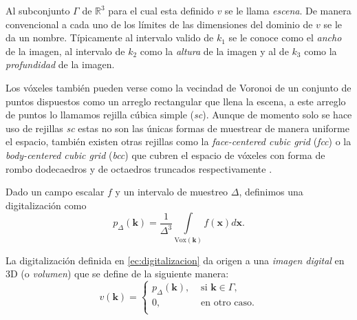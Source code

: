 Al subconjunto $\Gamma$ de $\mathbb{R}^3$ para el cual esta definido $v$ se le llama \emph{escena}. De manera convencional a cada uno de los límites de las dimensiones del dominio de $v$ se le da un nombre. Típicamente al intervalo valido de $k_1$ se le conoce como el \emph{ancho} de la imagen, al intervalo de $k_2$ como la \emph{altura} de la imagen y al de $k_3$ como la \emph{profundidad} de la imagen.

Los vóxeles también pueden verse como la vecindad de Voronoi de un conjunto de puntos dispuestos como un arreglo rectangular que llena la escena\cite{Gabor:DigitalSpaces}, a este arreglo de puntos lo llamamos rejilla cúbica simple (\emph{sc}). Aunque de momento solo se hace uso de rejillas \emph{sc} estas no son las únicas formas de muestrear de manera uniforme el espacio, también existen otras rejillas como la \emph{face-centered cubic grid} (\emph{fcc}) o la \emph{body-centered cubic grid} (\emph{bcc}) que cubren el espacio de vóxeles con forma de rombo dodecaedros y de octaedros truncados respectivamente \cite{Gabor:DigitalSpaces}.


Dado un campo escalar $f$ y un intervalo de muestreo $\Delta$, definimos una digitalización como
\begin{equation}
  p_{\Delta}( \textbf{k} ) = \dfrac{1}{\Delta^3} \int \limits_{\text{Vox} ( \textbf{k} )} f(\textbf{x}) d\textbf{x}.
  \label{ec:digitalizacion}
\end{equation}

La digitalización definida en \eqref{ec:digitalizacion} da origen a una \emph{imagen digital} en 3D (o \emph{volumen}) que se define de la siguiente manera:
\begin{equation}
  v(\textbf{k}) =
  \begin{cases} 
      p_{\Delta}(\textbf{k}), & \text{ si } \textbf{k} \in \Gamma, \\
      0, & \text{ en otro caso.} \\                                
    \end{cases}
  \label{ec:imagen3D}
\end{equation}

